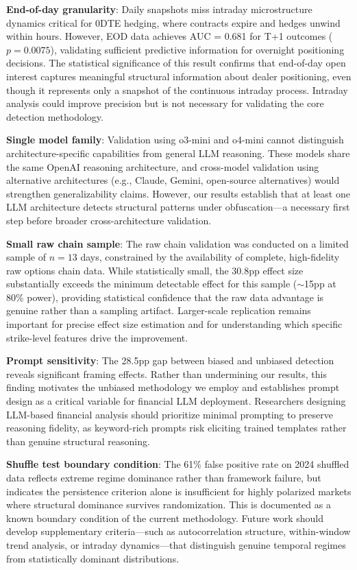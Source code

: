 \textbf{End-of-day granularity}: Daily snapshots miss intraday microstructure dynamics critical for 0DTE hedging, where contracts expire and hedges unwind within hours. However, EOD data achieves AUC = 0.681 for T+1 outcomes ($p = 0.0075$), validating sufficient predictive information for overnight positioning decisions. The statistical significance of this result confirms that end-of-day open interest captures meaningful structural information about dealer positioning, even though it represents only a snapshot of the continuous intraday process. Intraday analysis could improve precision but is not necessary for validating the core detection methodology.

\textbf{Single model family}: Validation using o3-mini and o4-mini cannot distinguish architecture-specific capabilities from general LLM reasoning. These models share the same OpenAI reasoning architecture, and cross-model validation using alternative architectures (e.g., Claude, Gemini, open-source alternatives) would strengthen generalizability claims. However, our results establish that at least one LLM architecture detects structural patterns under obfuscation---a necessary first step before broader cross-architecture validation.

\textbf{Small raw chain sample}: The raw chain validation was conducted on a limited sample of $n = 13$ days, constrained by the availability of complete, high-fidelity raw options chain data. While statistically small, the 30.8pp effect size substantially exceeds the minimum detectable effect for this sample ($\sim$15pp at 80\% power), providing statistical confidence that the raw data advantage is genuine rather than a sampling artifact. Larger-scale replication remains important for precise effect size estimation and for understanding which specific strike-level features drive the improvement.

\textbf{Prompt sensitivity}: The 28.5pp gap between biased and unbiased detection reveals significant framing effects. Rather than undermining our results, this finding motivates the unbiased methodology we employ and establishes prompt design as a critical variable for financial LLM deployment. Researchers designing LLM-based financial analysis should prioritize minimal prompting to preserve reasoning fidelity, as keyword-rich prompts risk eliciting trained templates rather than genuine structural reasoning.

\textbf{Shuffle test boundary condition}: The 61\% false positive rate on 2024 shuffled data reflects extreme regime dominance rather than framework failure, but indicates the persistence criterion alone is insufficient for highly polarized markets where structural dominance survives randomization. This is documented as a known boundary condition of the current methodology. Future work should develop supplementary criteria---such as autocorrelation structure, within-window trend analysis, or intraday dynamics---that distinguish genuine temporal regimes from statistically dominant distributions.

